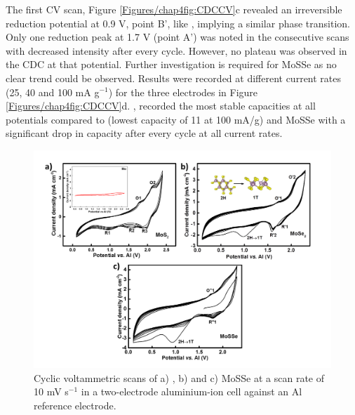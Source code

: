 The first CV scan, Figure \ref{Figures/chap4fig:CDCCV}c revealed an irreversible reduction potential at 0.9 V, point B', like , implying a similar phase transition. Only one reduction peak at 1.7 V (point A') was noted in the consecutive scans with decreased intensity after every cycle. However, no plateau was observed in the CDC at that potential. Further investigation is required for MoSSe as no clear trend could be observed. Results were recorded at different current rates (25, 40 and 100 mA g$^{-1}$) for the three electrodes in Figure \ref{Figures/chap4fig:CDCCV}d. , recorded the most stable capacities at all potentials compared to  (lowest capacity of 11 at 100 mA/g) and MoSSe with a significant drop in capacity after every cycle at all current rates. 
\begin{figure}[htb!]
\centering
\includegraphics[width=\textwidth]{Figures/chap4fig/CV}
\caption{Cyclic voltammetric scans of a) , b)  and c) MoSSe at a scan rate of 10 mV s$^{-1}$ in a two-electrode aluminium-ion cell against an Al reference electrode.}
\label{Figures/chap4fig:CV}
\end{figure} 

